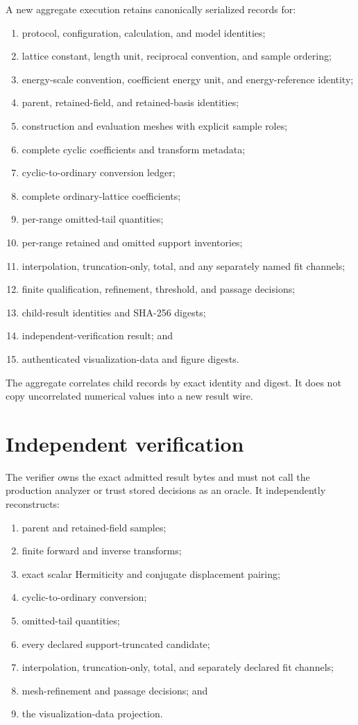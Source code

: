 \documentclass[11pt]{article}
\begin{document}
A new aggregate execution retains canonically serialized records for:
\begin{enumerate}[leftmargin=*]
  \item protocol, configuration, calculation, and model identities;
  \item lattice constant, length unit, reciprocal convention, and sample ordering;
  \item energy-scale convention, coefficient energy unit, and energy-reference identity;
  \item parent, retained-field, and retained-basis identities;
  \item construction and evaluation meshes with explicit sample roles;
  \item complete cyclic coefficients and transform metadata;
  \item cyclic-to-ordinary conversion ledger;
  \item complete ordinary-lattice coefficients;
  \item per-range omitted-tail quantities;
  \item per-range retained and omitted support inventories;
  \item interpolation, truncation-only, total, and any separately named fit channels;
  \item finite qualification, refinement, threshold, and passage decisions;
  \item child-result identities and SHA-256 digests;
  \item independent-verification result; and
  \item authenticated visualization-data and figure digests.
\end{enumerate}

The aggregate correlates child records by exact identity and digest.  It does not copy
uncorrelated numerical values into a new result wire.

\section{Independent verification}

The verifier owns the exact admitted result bytes and must not call the production
analyzer or trust stored decisions as an oracle.  It independently reconstructs:
\begin{enumerate}[leftmargin=*]
  \item parent and retained-field samples;
  \item finite forward and inverse transforms;
  \item exact scalar Hermiticity and conjugate displacement pairing;
  \item cyclic-to-ordinary conversion;
  \item omitted-tail quantities;
  \item every declared support-truncated candidate;
  \item interpolation, truncation-only, total, and separately declared fit channels;
  \item mesh-refinement and passage decisions; and
  \item the visualization-data projection.
\end{enumerate}
\end{document}
